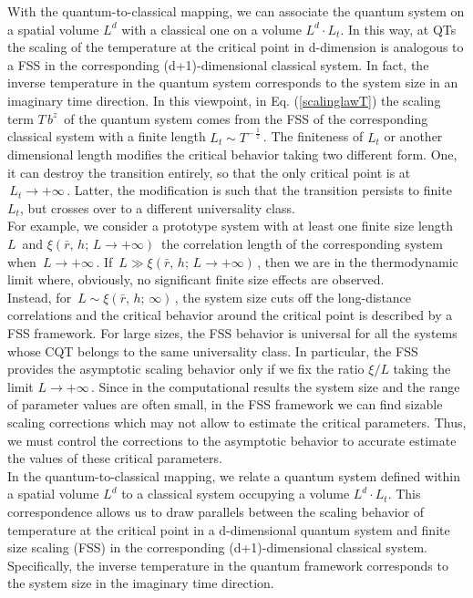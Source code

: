 With the quantum-to-classical mapping, we can associate the quantum system on a spatial volume $L^d$ with a classical one on a volume $L^d \cdot L_t$. In this way, at QTs the scaling of the temperature at the critical point in d-dimension is analogous to a FSS in the corresponding (d+1)-dimensional classical system. In fact, the inverse temperature in the quantum system corresponds to the system size in an imaginary time direction.  In this viewpoint, in Eq. (\ref{scalinglawT}) the scaling term $T\,b^z\,$ of the quantum system comes from the FSS of the corresponding classical system with a finite length $L_t \sim T^{-\,\frac{1}{z}}\,$. The finiteness of $L_t$ or another dimensional length  modifies the critical behavior taking two different form. One, it can destroy the transition entirely, so that the only critical point is at $\,L_t \to +\infty\,$. Latter, the modification is such that the transition persists to finite $L_t$, but crosses over to a different universality class. \\
For example, we consider a prototype system with at least one finite size length $L\,$ and $\xi(\bar r, \, h ;\,L \to +\infty)\,$ the correlation length of the corresponding system when $\,L\to +\infty\,$. If $\,L\gg  \xi(\bar r, \, h ;\,L \to +\infty)\,$, then we are in the thermodynamic limit where, obviously, no significant finite size effects are observed. \\
Instead, for $\, L \sim \xi(\bar r, \, h ;\,\infty)\,$, the system size cuts off the long-distance correlations and the critical behavior around the critical point is described by a FSS framework. For large sizes, the FSS behavior is universal for all the systems whose CQT belongs to the same universality class. In particular, the FSS provides the asymptotic scaling behavior only if we fix the ratio $\xi/L$ taking the limit $L \to +\infty\,$. Since in the computational results the system size and the range of parameter values are often small, in the FSS framework we can find sizable scaling corrections which may not allow to estimate the critical parameters. Thus, we must control the corrections to the asymptotic behavior to accurate estimate the values of these critical parameters.\\


In the quantum-to-classical mapping, we relate a quantum system defined within a spatial volume $L^d$ to a classical system occupying a volume $L^d \cdot L_t$. This correspondence allows us to draw parallels between the scaling behavior of temperature at the critical point in a d-dimensional quantum system and finite size scaling (FSS) in the corresponding (d+1)-dimensional classical system. Specifically, the inverse temperature in the quantum framework corresponds to the system size in the imaginary time direction.

